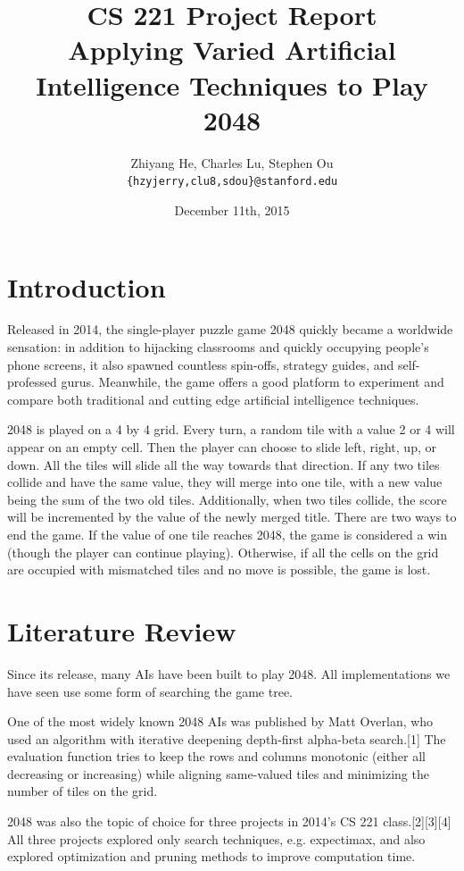 \documentclass[9pt,twocolumn]{article}
\title{CS 221 Project Report \\ Applying Varied Artificial Intelligence Techniques to Play 2048}
\author{Zhiyang He, Charles Lu, Stephen Ou \\ \texttt{\{hzyjerry,clu8,sdou\}@stanford.edu}}
\date{December 11th, 2015}
\begin{document}
\maketitle

\section{Introduction}

Released in 2014, the single-player puzzle game 2048 quickly became a worldwide sensation: in addition to hijacking classrooms and quickly occupying people's phone screens, it also spawned countless spin-offs, strategy guides, and self-professed gurus. Meanwhile, the game offers a good platform to experiment and compare both traditional and cutting edge artificial intelligence techniques.

2048 is played on a 4 by 4 grid. Every turn, a random tile with a value 2 or 4 will appear on an empty cell. Then the player can choose to slide left, right, up, or down. All the tiles will slide all the way towards that direction. If any two tiles collide and have the same value, they will merge into one tile, with a new value being the sum of the two old tiles. Additionally, when two tiles collide, the score will be incremented by the value of the newly merged title. There are two ways to end the game. If the value of one tile reaches 2048, the game is considered a win (though the player can continue playing). Otherwise, if all the cells on the grid are occupied with mismatched tiles and no move is possible, the game is lost.

\section{Literature Review}

Since its release, many AIs have been built to play 2048. All implementations we have seen use some form of searching the game tree.

One of the most widely known 2048 AIs was published by Matt Overlan, who used an algorithm with iterative deepening depth-first alpha-beta search.[1] The evaluation function tries to keep the rows and columns monotonic (either all decreasing or increasing) while aligning same-valued tiles and minimizing the number of tiles on the grid.

2048 was also the topic of choice for three projects in 2014's CS 221 class.[2][3][4] All three projects explored only search techniques, e.g. expectimax, and also explored optimization and pruning methods to improve computation time.
\end{document}

